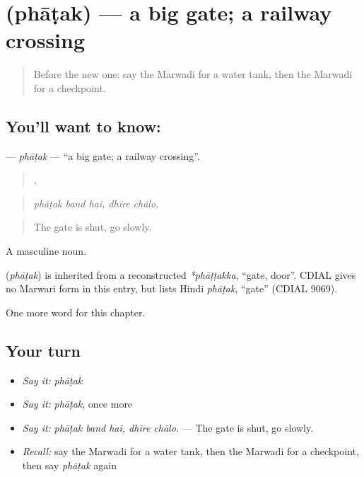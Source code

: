 \section[\texorpdfstring{\mw{फाटक} (phāṭak)}{फाटक (phāṭak)}]{ (phāṭak) — a big gate; a railway crossing}

\label{lesson:MW-C207-phatak}



\begin{quote}
Before the new one: say the Marwadi for a water tank, then the Marwadi for a checkpoint.
\end{quote}

\subsection*{You'll want to know: }
\textbf{} — \emph{phāṭak} — \textquotedblleft{}a big gate; a railway crossing\textquotedblright{}.

\begin{quote}
  ,  
\end{quote}

\begin{quote}
\emph{phāṭak band hai, dhīre chālo.}
\end{quote}

\begin{quote}
The gate is shut, go slowly.
\end{quote}

A masculine noun.

\begin{cousinweb}
\textbf{} (\emph{phāṭak}) is inherited from a reconstructed \emph{*phāṭṭakka}, \textquotedblleft{}gate, door\textquotedblright{}. CDIAL gives no Marwari form in this entry, but lists Hindi \emph{phāṭak}, \textquotedblleft{}gate\textquotedblright{} (CDIAL 9069).
\end{cousinweb}

\begin{grammarlens}[title={What you've built}]
One more word for this chapter.
\end{grammarlens}

\subsection*{Your turn}
\begin{itemize}
\raggedright
  \item \emph{Say it:} \emph{phāṭak}
  \item \emph{Say it:} \emph{phāṭak}, once more
  \item \emph{Say it:} \emph{phāṭak band hai, dhīre chālo.} — The gate is shut, go slowly.
  \item \emph{Recall:} say the Marwadi for a water tank, then the Marwadi for a checkpoint, then say \emph{phāṭak} again
\end{itemize}

